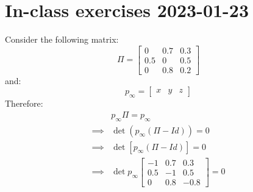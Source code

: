 \documentclass{article}
\newcommand{\1}{\mathbf{1}}
\begin{document}
\section{In-class exercises 2023-01-23}
Consider the following matrix:
$$
  \Pi =
  \begin{bmatrix}
    0   & 0.7 & 0.3 \\
    0.5 & 0   & 0.5 \\
    0   & 0.8 & 0.2
  \end{bmatrix}
$$
and:
$$
  p_\infty =
  \begin{bmatrix}
    x & y & z
  \end{bmatrix}
$$
Therefore:
\begin{align*}
           & p_\infty \Pi = p_\infty       \\
  \implies &
  \det(p_\infty (\Pi - Id)) = 0            \\
  \implies &
  \det\left[p_\infty (\Pi - Id)\right] = 0 \\
  \implies &
  \det p_\infty
  \begin{bmatrix}
    -1  & 0.7 & 0.3  \\
    0.5 & -1  & 0.5  \\
    0   & 0.8 & -0.8
  \end{bmatrix}
  = 0                                      \\
\end{align*}
\end{document}

